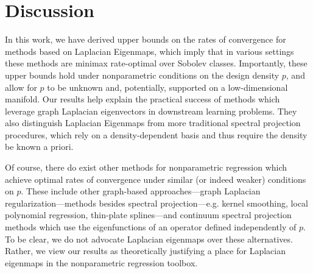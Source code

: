 \section{Discussion}
\label{sec:discussion}

In this work, we have derived upper bounds on the rates of convergence for methods based on Laplacian Eigenmaps, which imply that in various settings these methods are minimax rate-optimal over Sobolev classes. Importantly, these upper bounds hold under nonparametric conditions on the design density $p$, and allow for $p$ to be unknown and, potentially, supported on a low-dimensional manifold. Our results help explain the practical success of methods which leverage graph Laplacian eigenvectors in downstream learning problems. They also distinguish Laplacian Eigenmaps from more traditional spectral projection procedures, which rely on a density-dependent basis and thus require the density be known a priori.

Of course, there do exist other methods for nonparametric regression which achieve optimal rates of convergence under similar (or indeed weaker) conditions on $p$. These include other graph-based approaches---graph Laplacian regularization---methods besides spectral projection---e.g. kernel smoothing, local polynomial regression, thin-plate splines---and continuum spectral projection methods which use the eigenfunctions of an operator defined independently of $p$. To be clear, we do not advocate Laplacian eigenmaps over these alternatives. Rather, we view our results as theoretically justifying a place for Laplacian eigenmaps in the nonparametric regression toolbox. 

